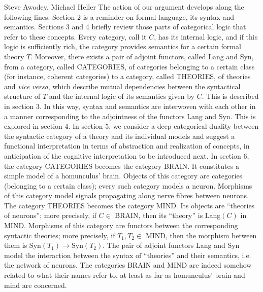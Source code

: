 \begin{artengenv2auth}{Steve Awodey, Michael Heller}
The action of our argument develops along the following lines. Section 2 is a reminder on formal language, its syntax and semantics. Sections 3 and 4 briefly review those parts of categorical logic that refer to these concepts. Every category, call it $C$, has its internal logic, and if this logic is sufficiently rich, the category provides semantics for a certain formal theory $T$. Moreover, there exists a pair of adjoint functors, called Lang and Syn, from a category, called CATEGORIES, of categories belonging to a certain class  (for instance, coherent categories) to a category, called THEORIES, of theories and \textit{vice versa}, which describe mutual dependencies between the syntactical structure of $T$ and the internal logic of its semantics given by $C$. This is described in section 3. In this way, syntax and semantics are interwoven with each other in a manner corresponding to the adjointness of the functors Lang and Syn. This is explored in section 4.  In section 5, we consider a deep categorical duality between the syntactic category of a theory and its individual models and suggest a functional interpretation in terms of abstraction and realization of concepts, in anticipation of the cognitive interpretation to be introduced next.
In section 6, the category CATEGORIES becomes the category BRAIN. It constitutes a simple model of a homunculus' brain. Objects of this category are categories (belonging to a certain class); every such category models a neuron. Morphisms of this category model signals propagating along nerve fibres between neurons. The category THEORIES becomes the category MIND. Its objects are ``theories of neurons''; more precisely, if $C \in $ BRAIN, then its ``theory'' is Lang$(C)$ in MIND. Morphisms of this category are functors between the corresponding syntactic theories; more precisely, if $T_1, T_2 \in $ MIND, then the morphism between them is $\mathrm{Syn}(T_1) \to \mathrm{Syn}(T_2)$. The pair of adjoint functors Lang and Syn model the interaction between the syntax of ``theories'' and their semantics, i.e. the network of neurons. The categories BRAIN and MIND are indeed somehow related to what their names refer to, at least as far as homunculus' brain and mind are concerned.


\end{artengenv2auth}
